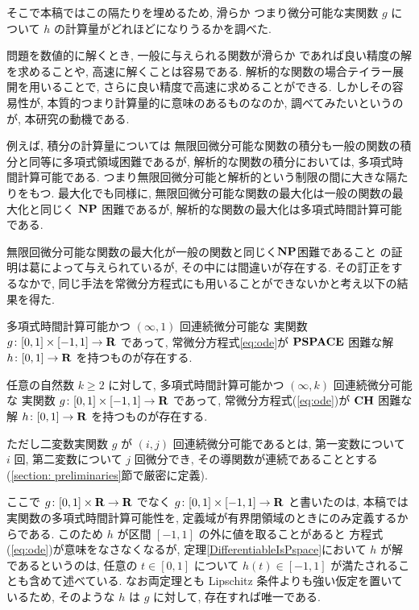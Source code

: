 そこで本稿ではこの隔たりを埋めるため, 滑らか
つまり微分可能な実関数 $g$ について $h$ の計算量がどれほどになりうるかを調べた.


問題を数値的に解くとき, 一般に与えられる関数が滑らか
であれば良い精度の解を求めることや, 高速に解くことは容易である.
解析的な関数の場合テイラー展開を用いることで, さらに良い精度で高速に求めることができる.
しかしその容易性が, 本質的つまり計算量的に意味のあるものなのか, 調べてみたいというのが,
本研究の動機である.

例えば, 積分の計算量については
無限回微分可能な関数の積分も一般の関数の積分と同等に多項式領域困難であるが,
解析的な関数の積分においては, 多項式時間計算可能である.
つまり無限回微分可能と解析的という制限の間に大きな隔たりをもつ.
最大化でも同様に, 無限回微分可能な関数の最大化は一般の関数の最大化と同じく
$\mathbf{NP}$ 困難であるが,
解析的な関数の最大化は多項式時間計算可能である.


無限回微分可能な関数の最大化が一般の関数と同じく$\mathbf{NP}$困難であること
の証明は葛によって与えられているが, その中には間違いが存在する.
その訂正をするなかで, 同じ手法を常微分方程式にも用いることができないかと考え以下の結果を得た.

 \begin{theorem}
  \label{DifferentiableIsPspace}
  多項式時間計算可能かつ $(\infty, 1)$ 回連続微分可能な
  実関数 $g \colon [0,1] \times [-1,1] \to \mathbf R$ であって, 
  常微分方程式\eqref{eq:ode}が
  $\mathbf{PSPACE}$ 困難な解 $h \colon [0, 1] \to \mathbf R$ を持つものが存在する.
 \end{theorem}

 \begin{theorem}
  \label{KTimesIsCH}
  任意の自然数 $k \ge 2$ に対して, 
  多項式時間計算可能かつ $(\infty, k)$ 回連続微分可能な
  実関数 $g \colon [0,1] \times [-1,1] \to \mathbf R$ であって, 
  常微分方程式(\ref{eq:ode})が
  $\mathbf{CH}$ 困難な解 $h \colon [0, 1] \to \mathbf R$ を持つものが存在する.
 \end{theorem}

ただし二変数実関数 $g$ が $(i, j)$ 回連続微分可能であるとは,
第一変数について $i$ 回, 第二変数について $j$ 回微分でき, 
その導関数が連続であることとする
(\ref{section: preliminaries}節で厳密に定義).

ここで $g \colon [0,1] \times \mathbf R \to \mathbf R$ でなく
$g \colon [0,1] \times [-1, 1] \to \mathbf R$ と書いたのは, 
本稿では実関数の多項式時間計算可能性を, 
定義域が有界閉領域のときにのみ定義するからである. 
このため $h$ が区間 $[-1, 1]$ の外に値を取ることがあると
方程式(\ref{eq:ode})が意味をなさなくなるが, 
定理\ref{DifferentiableIsPspace}において $h$ が解であるというのは, 
任意の $t \in [0, 1]$ について $h (t) \in [-1, 1]$ が満たされることも含めて述べている.
なお両定理とも Lipschitz 条件よりも強い仮定を置いているため, 
そのような $h$ は $g$ に対して, 存在すれば唯一である. 

